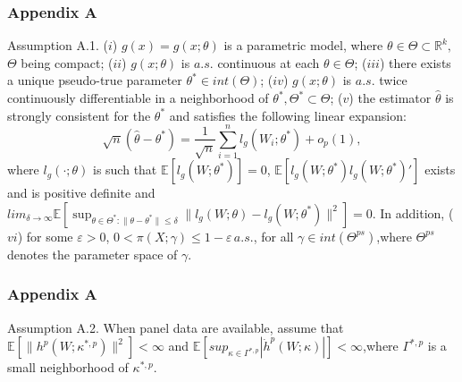 \documentclass{beamer}
\begin{document}

\begin{frame}\frametitle{Appendix A}
    \footnotesize
    \begin{block}{Assumption A.1.}
    ($i$) $g(x) = g(x;\theta)$ is a parametric model, where $\theta \in \Theta \subset \mathbb{R}^{k},$ $\Theta$ being compact; ($ii$) $g(x;\theta)$ is $a.s.$ continuous at each $\theta \in \Theta$; ($iii$) there exists a unique pseudo-true parameter $\theta^{\ast} \in int(\Theta)$; ($iv$) $g(x;\theta)$ is $a.s.$ twice continuously differentiable in a neighborhood of $\theta^{\ast}, \Theta^{\ast} \subset \Theta$; ($v$) the estimator $\widehat{\theta}$ is strongly consistent for the $\theta^{\ast}$ and satisfies the following linear expansion:
    \footnotesize
    \begin{equation*}
        \sqrt{n}(\widehat{\theta} - \theta^{\ast}) = \frac{1}{\sqrt{n}} \sum_{i = 1}^{n}l_{g}(W_{i};\theta^{\ast}) + o_{p}(1),
    \end{equation*}
    \normalsize
    \footnotesize
    where $l_{g}(\cdot;\theta)$ is such that $\mathbb{E}[l_{g}(W;\theta^{\ast})] = 0$, $\mathbb{E}[l_{g}(W;\theta^{\ast})l_{g}(W;\theta^{\ast})']$ exists and is positive definite and $ lim_{\delta \to \infty} \mathbb{E}\left[\sup_{\theta \in \Theta^{\ast}:\|\theta-\theta^{\ast}\| \leq \delta}\|l_{g}(W;\theta)-l_{g}(W;\theta^{\ast})\|^{2} \right] = 0$. In addition, ($vi$) for some $\varepsilon > 0$, $0 < \pi(X;\gamma) \leq 1 - \varepsilon \,a.s.$, for all $\gamma \in int(\Theta^{ps})$,where $\Theta^{ps}$ denotes the parameter space of $\gamma$.
    \normalsize
    \end{block}
    \normalsize
\end{frame}

\begin{frame}\frametitle{Appendix A}
    \begin{block}{Assumption A.2.}
        When panel data are available, assume that $\mathbb{E}[\|h^{p}(W;\kappa^{\ast, p})\|^{2}] < \infty$ and $\mathbb{E}[sup_{\kappa \in \Gamma^{\ast, p}}|\dot{h}^{p}(W;\kappa)|] < \infty$,where $\Gamma^{\ast, p}$ is a small neighborhood of $\kappa^{\ast, p}$.
    \end{block}
\end{frame}
\end{document}
